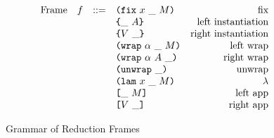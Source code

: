 \documentclass[../main.tex]{subfiles}
\begin{document}
\begin{figure*}[t]
    \centering
    \[\begin{array}{lrclr}
        \textrm{Frame} & f & ::= & \texttt{(} \texttt{fix} ~ x ~ \_ ~ M \texttt{)}                        & \textrm{fix}\\
                       &   &     & \texttt{\{}\_ ~ A\texttt{\}}                     & \textrm{left instantiation}\\
                       &   &     & \texttt{\{}V ~ \_\texttt{\}}                    & \textrm{right instantiation}\\
                       &   &     & \texttt{(} \texttt{wrap} ~ \alpha ~ \_ ~ M \texttt{)}             & \textrm{left wrap}\\
                       &   &     & \texttt{(} \texttt{wrap} ~ \alpha ~ A ~ \_ \texttt{)}            & \textrm{right wrap}\\
                       &   &     & \texttt{(} \texttt{unwrap} ~ \_ \texttt{)}{}                        & \textrm{unwrap}\\
                       &   &     & \texttt{(} \texttt{lam} ~ x ~ \_ ~ M \texttt{)}                   & \textrm{$\lambda$}\\
                       &   &     & \texttt{[} \_ ~ M \texttt{]}                      & \textrm{left app}\\
                       &   &     & \texttt{[} V ~ \_ \texttt{]}                     & \textrm{right app}\\
    \end{array}\]
    \caption{Grammar of Reduction Frames}
    \label{fig:Plutus_core_reduction_frames}
\end{figure*}
\end{document}
